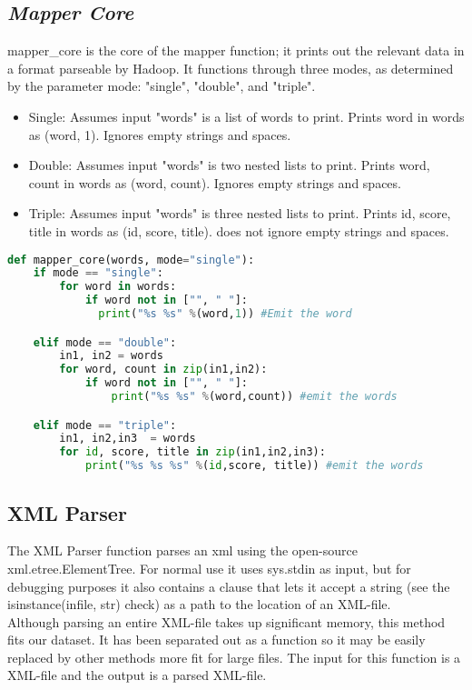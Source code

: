 \documentclass[fleqn,10pt]{wlscirep}
\begin{document}
\subsection{\emph{Mapper Core}}
mapper\_core is the core of the mapper function; it prints out the relevant data in a format parseable by Hadoop. It functions through three modes, as determined by the parameter mode: "single", "double", and "triple".

\begin{itemize}
  \item Single: Assumes input "words" is a list of words to print. Prints word in words as (word, 1). Ignores empty strings and spaces.
  \item Double: Assumes input "words" is two nested lists to print. Prints word, count in words as (word, count). Ignores empty strings and spaces.
  \item Triple: Assumes input "words" is three nested lists to print. Prints id, score, title in words as (id, score, title). does not ignore empty strings and spaces.
\end{itemize}

\begin{lstlisting}[language=Python, caption=mapper\_core function]
def mapper_core(words, mode="single"):
    if mode == "single":
        for word in words:
            if word not in ["", " "]:
              print("%s %s" %(word,1)) #Emit the word

    elif mode == "double":
        in1, in2 = words
        for word, count in zip(in1,in2):
            if word not in ["", " "]:
                print("%s %s" %(word,count)) #emit the words

    elif mode == "triple":
        in1, in2,in3  = words
        for id, score, title in zip(in1,in2,in3):
            print("%s %s %s" %(id,score, title)) #emit the words

\end{lstlisting}

\subsection{XML Parser}
The XML Parser function parses an xml using the open-source xml.etree.ElementTree. For normal use it uses sys.stdin as input, but for debugging purposes it also contains a clause that lets it accept a string (see the isinstance(infile, str) check) as a path to the location of an XML-file.\\
Although parsing an entire XML-file takes up significant memory, this method fits our dataset. It has been separated out as a function so it may be easily replaced by other methods more fit for large files. The input for this function is a XML-file and the output is a parsed XML-file.
\end{document}
